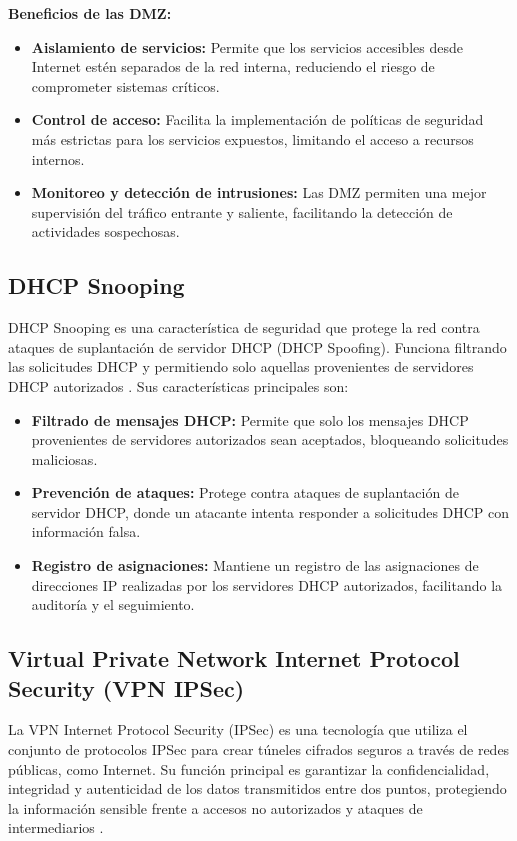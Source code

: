 \textbf{Beneficios de las DMZ:}
\begin{itemize}
    \item \textbf{Aislamiento de servicios:} Permite que los servicios accesibles desde Internet estén separados de la red interna, reduciendo el riesgo de comprometer sistemas críticos.
    \item \textbf{Control de acceso:} Facilita la implementación de políticas de seguridad más estrictas para los servicios expuestos, limitando el acceso a recursos internos.
    \item \textbf{Monitoreo y detección de intrusiones:} Las DMZ permiten una mejor supervisión del tráfico entrante y saliente, facilitando la detección de actividades sospechosas.
\end{itemize}

\subsection{DHCP Snooping}
\label{subsec:dhcpsnooping}
DHCP Snooping es una característica de seguridad que protege la red contra ataques de suplantación de servidor DHCP (DHCP Spoofing). Funciona filtrando las solicitudes DHCP y
permitiendo solo aquellas provenientes de servidores DHCP autorizados \cite{cisco_dhcp_snooping}. Sus características principales son:
\begin{itemize}
    \item \textbf{Filtrado de mensajes DHCP:} Permite que solo los mensajes DHCP provenientes de servidores autorizados sean aceptados, bloqueando solicitudes maliciosas.
    \item \textbf{Prevención de ataques:} Protege contra ataques de suplantación de servidor DHCP, donde un atacante intenta responder a solicitudes DHCP con información falsa.
    \item \textbf{Registro de asignaciones:} Mantiene un registro de las asignaciones de direcciones IP realizadas por los servidores DHCP autorizados, facilitando la auditoría y el seguimiento.
\end{itemize}

\subsection{Virtual Private Network Internet Protocol Security (VPN IPSec)}
\label{subsec:ipsec}
La \ac{VPN} Internet Protocol Security (IPSec) es una tecnología que utiliza el conjunto de protocolos IPSec para crear túneles cifrados seguros a través de redes públicas, 
como Internet. Su función principal es garantizar la confidencialidad, integridad y autenticidad de los datos transmitidos entre dos puntos, protegiendo la información 
sensible frente a accesos no autorizados y ataques de intermediarios \cite{ipsec}.

